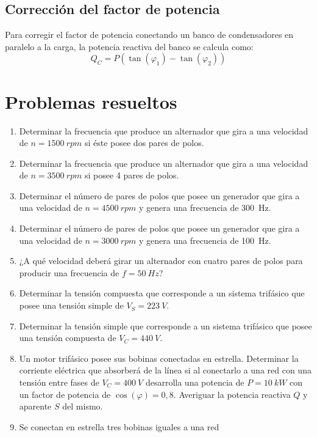 \documentclass[../main]{subfiles}
\begin{document}
\subsection{Corrección del factor de potencia}
Para corregir el factor de potencia conectando un banco de
condensadores en paralelo a la carga, la potencia reactiva del banco
se calcula como:
\begin{equation}
  Q_C = P \left( \tan(\varphi_1) - \tan(\varphi_2) \right)
\end{equation}


\section{Problemas resueltos}
\begin{enumerate}
  \item Determinar la frecuencia que produce un alternador que gira a
    una velocidad de $n=\qty{1500}{rpm}$ si éste posee dos pares de
    polos.
  \item Determinar la frecuencia que produce un alternador que gira a
    una velocidad de $n=\qty{3500}{rpm}$ si posee 4 pares de polos.
  \item Determinar el número de pares de polos que posee un generador
    que gira a una velocidad de $n=\qty{4500}{rpm}$ y genera una
    frecuencia de \qty{300}{Hz}.
  \item Determinar el número de pares de polos que posee un generador
    que gira a una velocidad de $n=\qty{3000}{rpm}$ y genera una
    frecuencia de \qty{100}{Hz}.
  \item ¿A qué velocidad deberá girar un alternador con cuatro pares
    de polos para producir una frecuencia de $f=\qty{50}{Hz}$?
  \item Determinar la tensión compuesta que corresponde a un sistema
    trifásico que posee una tensión simple de $V_S=\qty{223}{V}$.
  \item Determinar la tensión simple que corresponde a un sistema
    trifásico que posee una tensión compuesta de $V_C=\qty{440}{V}$.
  \item Un motor trifásico posee sus bobinas conectadas en estrella.
    Determinar la corriente eléctrica que absorberá de la línea si al
    conectarlo a una red con una tensión entre fases de
    $V_C=\qty{400}{V}$ desarrolla una potencia de $P=\qty{10}{kW}$ con
    un factor de potencia de $\cos(\varphi)=0{,}8$. Averiguar la
    potencia reactiva $Q$ y aparente $S$ del mismo.
  \item Se conectan en estrella tres bobinas iguales a una red

\end{enumerate}
\end{document}
